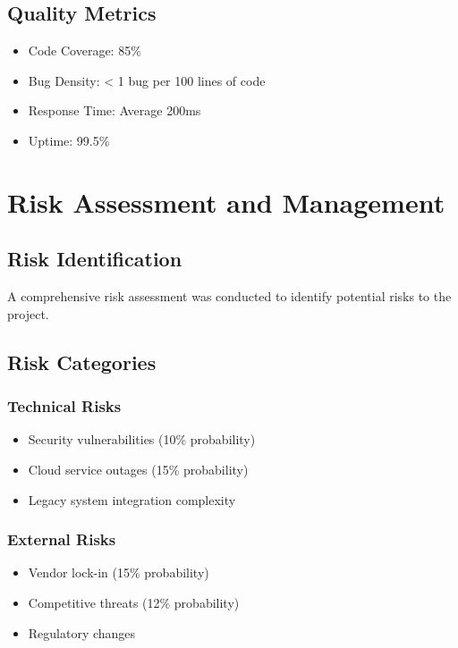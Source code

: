 \documentclass[12pt,a4paper]{report}
\begin{document}
\section{Quality Metrics}
\begin{itemize}[leftmargin=*]
    \item Code Coverage: 85\%
    \item Bug Density: < 1 bug per 100 lines of code
    \item Response Time: Average 200ms
    \item Uptime: 99.5\%
\end{itemize}

\chapter{Risk Assessment and Management}

\section{Risk Identification}
A comprehensive risk assessment was conducted to identify potential risks to the project.

\section{Risk Categories}
\subsection{Technical Risks}
\begin{itemize}[leftmargin=*]
    \item Security vulnerabilities (10\% probability)
    \item Cloud service outages (15\% probability)
    \item Legacy system integration complexity
\end{itemize}

\subsection{External Risks}
\begin{itemize}[leftmargin=*]
    \item Vendor lock-in (15\% probability)
    \item Competitive threats (12\% probability)
    \item Regulatory changes
\end{itemize}
\end{document}
